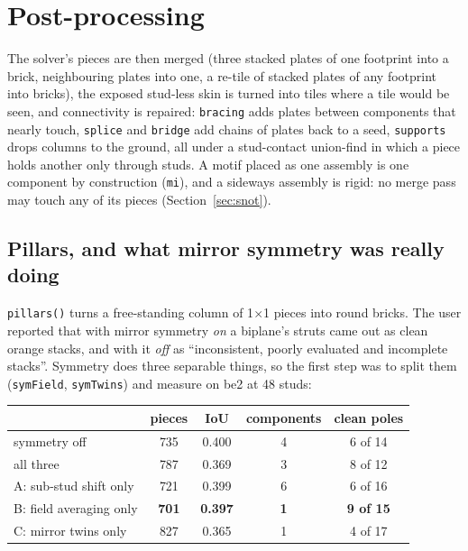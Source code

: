 \documentclass[10pt,a4paper]{article}
\newcommand{\code}[1]{\texttt{\small #1}}
\begin{document}
\section{Post-processing}\label{sec:post}
The solver's pieces are then merged (three stacked plates of one footprint into a brick, neighbouring plates into one, a re-tile of
stacked plates of any footprint into bricks), the exposed stud-less skin is turned into tiles where a tile would be seen, and
connectivity is repaired: \code{bracing} adds plates between components that nearly touch, \code{splice} and \code{bridge} add
chains of plates back to a seed, \code{supports} drops columns to the ground, all under a stud-contact union-find in which a
piece holds another only through studs. A motif placed as one assembly is one component by construction (\code{mi}), and a
sideways assembly is rigid: no merge pass may touch any of its pieces (Section~\ref{sec:snot}).

\subsection{Pillars, and what mirror symmetry was really doing}\label{sec:poles}
\code{pillars()} turns a free-standing column of 1$\times$1 pieces into round bricks. The user reported that with mirror symmetry
\emph{on} a biplane's struts came out as clean orange stacks, and with it \emph{off} as ``inconsistent, poorly evaluated and
incomplete stacks''. Symmetry does three separable things, so the first step was to split them (\code{symField},
\code{symTwins}) and measure on be2 at 48 studs:

\begin{center}\small
\begin{tabular}{lcccc}\toprule
 & pieces & IoU & components & clean poles \\ \midrule
symmetry off & 735 & 0.400 & 4 & 6 of 14 \\
all three & 787 & 0.369 & 3 & 8 of 12 \\
A: sub-stud shift only & 721 & 0.399 & 6 & 6 of 16 \\
B: field averaging only & \textbf{701} & \textbf{0.397} & \textbf{1} & \textbf{9 of 15} \\
C: mirror twins only & 827 & 0.365 & 1 & 4 of 17 \\ \bottomrule
\end{tabular}
\end{center}
\end{document}
